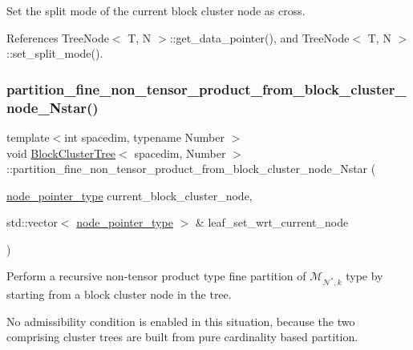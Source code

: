 Set the split mode of the current block cluster node as cross.

References Tree\+Node$<$ T, N $>$\+::get\+\_\+data\+\_\+pointer(), and Tree\+Node$<$ T, N $>$\+::set\+\_\+split\+\_\+mode().

\mbox{\label{classBlockClusterTree_afdeb6723e01b5eaf11281e2c1c1cf566}} 
\subsubsection{\texorpdfstring{partition\+\_\+fine\+\_\+non\+\_\+tensor\+\_\+product\+\_\+from\+\_\+block\+\_\+cluster\+\_\+node\+\_\+\+Nstar()}{partition\_fine\_non\_tensor\_product\_from\_block\_cluster\_node\_Nstar()}}
{\footnotesize\ttfamily template$<$int spacedim, typename Number $>$ \\
void \hyperlink{classBlockClusterTree}{Block\+Cluster\+Tree}$<$ spacedim, Number $>$\+::partition\+\_\+fine\+\_\+non\+\_\+tensor\+\_\+product\+\_\+from\+\_\+block\+\_\+cluster\+\_\+node\+\_\+\+Nstar (\begin{DoxyParamCaption}\item[{\hyperlink{classTreeNode}{node\+\_\+pointer\+\_\+type}}]{current\+\_\+block\+\_\+cluster\+\_\+node,  }\item[{std\+::vector$<$ \hyperlink{classTreeNode}{node\+\_\+pointer\+\_\+type} $>$ \&}]{leaf\+\_\+set\+\_\+wrt\+\_\+current\+\_\+node }\end{DoxyParamCaption})\hspace{0.3cm}{\ttfamily [private]}}

Perform a recursive non-\/tensor product type fine partition of $\mathcal{M}_{\mathcal{N}^*,k}$ type by starting from a block cluster node in the tree.

No admissibility condition is enabled in this situation, because the two comprising cluster trees are built from pure cardinality based partition.

